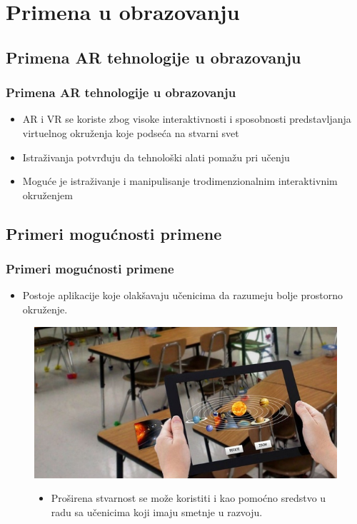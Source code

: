 \documentclass[9pt]{beamer}
\begin{document}
\section{Primena u obrazovanju}
\subsection{Primena AR  tehnologije u obrazovanju}
	\begin{frame} 
 \frametitle{Primena AR  tehnologije u obrazovanju}
    \begin{itemize}
    \setlength\itemsep{1.5em}
            \item AR i VR se koriste zbog visoke interaktivnosti i sposobnosti predstavljanja virtuelnog okruženja koje podseća na stvarni svet
            \item Istraživanja potvrđuju da tehnološki alati pomažu pri učenju
            \item Moguće je istraživanje i manipulisanje trodimenzionalnim interaktivnim okruženjem 
    \end{itemize}
 
	\end{frame}



 
\subsection{Primeri mogućnosti primene}

 \begin{frame}
 \frametitle{Primeri mogućnosti primene}
            \begin{itemize}
            \setlength\itemsep{1.5em}
		\item Postoje aplikacije koje olakšavaju učenicima da razumeju bolje prostorno okruženje. 
            \end{itemize}
            \begin{figure}[h!]
		\begin{center}
		\includegraphics[scale=0.3]{primer.jpg}
		\end{center}
  \begin{itemize}
		\item Proširena stvarnost se može koristiti i kao pomoćno sredstvo u radu sa učenicima koji imaju smetnje u razvoju.
            \end{itemize}
		
		\end{figure}
\end{frame}
\end{document}
